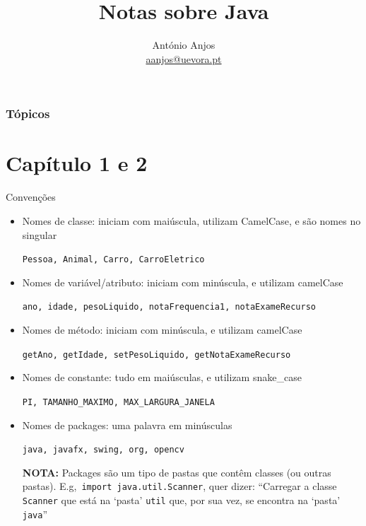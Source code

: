 \documentclass[portuguese, aspectratio=169, xcolor=table]{beamer}
\title[Java]{Notas sobre Java}
\author[António Anjos] %
{António Anjos\\\url{aanjos@uevora.pt}}
\institute[UÉ] %
{
    Departamento de Informática\\
    Universidade de Évora
}
\begin{document}
    \frame{\titlepage}


    \begin{frame}
        \frametitle{Tópicos}
        \tableofcontents
    \end{frame}






\section{Capítulo 1 e 2}

\begin{frame}{Convenções}
\begin{itemize}
        \item Nomes de classe: iniciam com maiúscula, utilizam CamelCase, e são nomes no singular

\hspace{0.25cm}\texttt{Pessoa, Animal, Carro, CarroEletrico}

    \item Nomes de variável/atributo: iniciam com minúscula, e utilizam camelCase

    \hspace{0.25cm}\texttt{ano, idade, pesoLiquido, notaFrequencia1, notaExameRecurso}

    \item Nomes de método: iniciam com minúscula, e utilizam camelCase

        \hspace{0.25cm}\texttt{getAno, getIdade, setPesoLiquido, getNotaExameRecurso}

    \item Nomes de constante: tudo em maiúsculas, e utilizam snake\_case

        \hspace{0.25cm}\texttt{PI, TAMANHO\_MAXIMO, MAX\_LARGURA\_JANELA}
\item Nomes de packages: uma palavra em minúsculas

\hspace{0.25cm}\texttt{java, javafx, swing, org, opencv}
\vspace{0.15cm}

\scriptsize \textbf{NOTA:} Packages são um tipo de pastas que contêm classes (ou outras pastas). E.g,\ \texttt{import java.util.Scanner}, quer dizer: ``Carregar a classe \texttt{Scanner} que está na `pasta' \texttt{util} que, por sua vez, se encontra na `pasta' \texttt{java}''
\end{itemize}
\end{frame}
\end{document}
